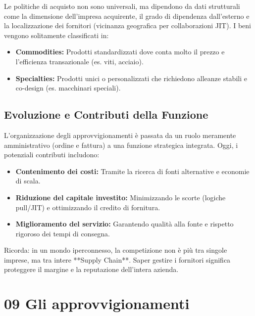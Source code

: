 \documentclass[a4paper,10pt]{article}
\begin{document}
Le politiche di acquisto non sono universali, ma dipendono da dati strutturali come la dimensione dell'impresa acquirente, il grado di dipendenza dall'esterno e la localizzazione dei fornitori (vicinanza geografica per collaborazioni JIT). 
I beni vengono solitamente classificati in:
\begin{itemize}
    \item \textbf{Commodities:} Prodotti standardizzati dove conta molto il prezzo e l'efficienza transazionale (es. viti, acciaio).
    \item \textbf{Specialties:} Prodotti unici o personalizzati che richiedono alleanze stabili e co-design (es. macchinari speciali).
\end{itemize}

\subsection*{Evoluzione e Contributi della Funzione}

L'organizzazione degli approvvigionamenti è passata da un ruolo meramente amministrativo (ordine e fattura) a una funzione strategica integrata. Oggi, i potenziali contributi includono:
\begin{itemize}
    \item \textbf{Contenimento dei costi:} Tramite la ricerca di fonti alternative e economie di scala.
    \item \textbf{Riduzione del capitale investito:} Minimizzando le scorte (logiche pull/JIT) e ottimizzando il credito di fornitura.
    \item \textbf{Miglioramento del servizio:} Garantendo qualità alla fonte e rispetto rigoroso dei tempi di consegna.

\end{itemize}

Ricorda: in un mondo iperconnesso, la competizione non è più tra singole imprese, ma tra intere **Supply Chain**. Saper gestire i fornitori significa proteggere il margine e la reputazione dell'intera azienda.
\section*{09 Gli approvvigionamenti}
\end{document}
